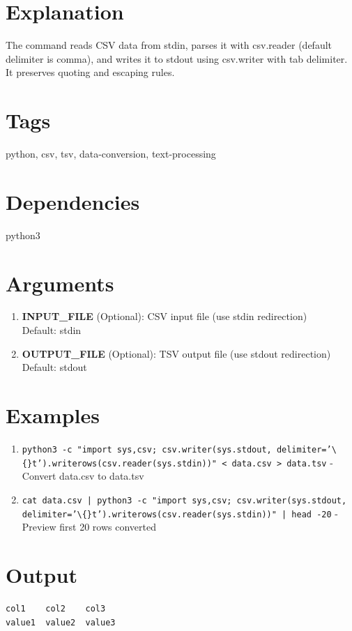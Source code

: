\documentclass[openany]{book}
\begin{document}
\section*{Explanation}
The command reads CSV data from stdin, parses it with csv.reader (default delimiter is comma), and writes it to stdout using csv.writer with tab delimiter. It preserves quoting and escaping rules.

\section*{Tags}
python, csv, tsv, data-conversion, text-processing

\section*{Dependencies}
python3


\section*{Arguments}
\begin{enumerate}
  \item \textbf{INPUT\_FILE} (Optional): CSV input file (use stdin redirection) \\ Default: stdin
  \item \textbf{OUTPUT\_FILE} (Optional): TSV output file (use stdout redirection) \\ Default: stdout
\end{enumerate}

\section*{Examples}
\begin{enumerate}
  \item \texttt{python3 -c "import sys,csv; csv.writer(sys.stdout, delimiter='\textbackslash\{\}t').writerows(csv.reader(sys.stdin))" < data.csv > data.tsv} - Convert data.csv to data.tsv
  \item \texttt{cat data.csv | python3 -c "import sys,csv; csv.writer(sys.stdout, delimiter='\textbackslash\{\}t').writerows(csv.reader(sys.stdin))" | head -20} - Preview first 20 rows converted
\end{enumerate}

\section*{Output}
\begin{lstlisting}
col1	col2	col3
value1	value2	value3

\end{lstlisting}
\end{document}
